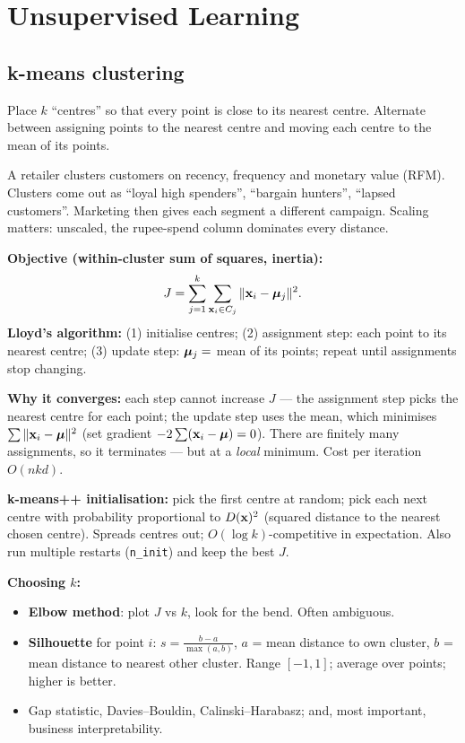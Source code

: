 \chapter{Unsupervised Learning}

\section{k-means clustering}
\begin{intuition}
Place $k$ ``centres'' so that every point is close to its nearest centre. Alternate between assigning points to the nearest centre and moving each centre to the mean of its points.
\end{intuition}

\begin{realworld}
A retailer clusters customers on recency, frequency and monetary value (RFM). Clusters come out as ``loyal high spenders'', ``bargain hunters'', ``lapsed customers''. Marketing then gives each segment a different campaign. Scaling matters: unscaled, the rupee-spend column dominates every distance.
\end{realworld}

\textbf{Objective (within-cluster sum of squares, inertia):}
\[J=\sum_{j=1}^k\sum_{\mathbf{x}_i\in C_j}\|\mathbf{x}_i-\bm{\mu}_j\|^2.\]
\textbf{Lloyd's algorithm:} (1) initialise centres; (2) assignment step: each point to its nearest centre; (3) update step: $\bm{\mu}_j=$ mean of its points; repeat until assignments stop changing.

\textbf{Why it converges:} each step cannot increase $J$ --- the assignment step picks the nearest centre for each point; the update step uses the mean, which minimises $\sum\|\mathbf{x}_i-\bm{\mu}\|^2$ (set gradient $-2\sum(\mathbf{x}_i-\bm{\mu})=0$). There are finitely many assignments, so it terminates --- but at a \emph{local} minimum. Cost per iteration $O(nkd)$.

\textbf{k-means++ initialisation:} pick the first centre at random; pick each next centre with probability proportional to $D(\mathbf{x})^2$ (squared distance to the nearest chosen centre). Spreads centres out; $O(\log k)$-competitive in expectation. Also run multiple restarts (\texttt{n\_init}) and keep the best $J$.

\textbf{Choosing $k$:}
\begin{itemize}
  \item \textbf{Elbow method}: plot $J$ vs $k$, look for the bend. Often ambiguous.
  \item \textbf{Silhouette} for point $i$: $s=\frac{b-a}{\max(a,b)}$, $a$ = mean distance to own cluster, $b$ = mean distance to nearest other cluster. Range $[-1,1]$; average over points; higher is better.
  \item Gap statistic, Davies--Bouldin, Calinski--Harabasz; and, most important, business interpretability.
\end{itemize}

